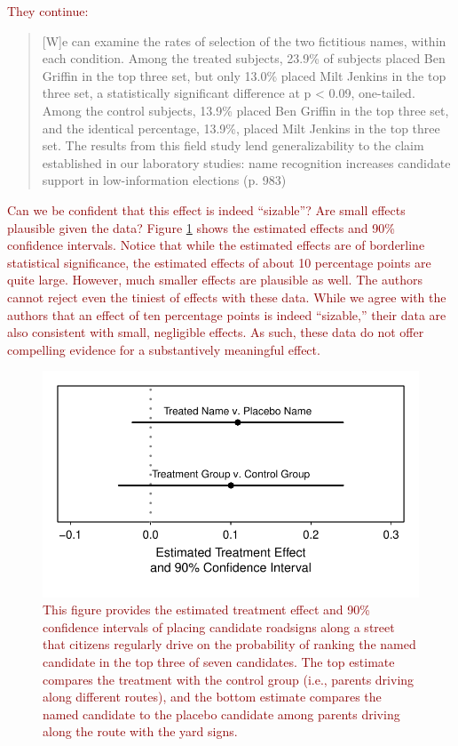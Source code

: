 \documentclass[12pt]{article}
\newcommand{\kelly}[1]{\textcolor{darkred}{#1}}
\begin{document}
\kelly{\noindent They continue:}

\kelly{\begin{quote}
[W]e can examine the rates of selection of the two fictitious names, within each condition. Among the treated subjects, 23.9\% of subjects placed Ben Griffin in the top three set, but only 13.0\% placed Milt Jenkins in the top three set, a statistically significant difference at p < 0.09, one-tailed. Among the control subjects, 13.9\% placed Ben Griffin in the top three set, and the identical percentage, 13.9\%, placed Milt Jenkins in the top three set. The results from this field study lend generalizability to the claim established in our laboratory studies: name recognition increases candidate support in low-information elections (p. 983)
\end{quote}}

\kelly{Can we be confident that this effect is indeed ``sizable''? Are small effects plausible given the data? Figure \ref{fig:kz-ci} shows the estimated effects and 90\% confidence intervals. Notice that while the estimated effects are of borderline statistical significance, the estimated effects of about 10 percentage points are quite large. However, much smaller effects are plausible as well. The authors cannot reject even the tiniest of effects with these data. While we agree with the authors that an effect of ten percentage points is indeed ``sizable,'' their data are also consistent with small, negligible effects. As such, these data do not offer compelling evidence for a substantively meaningful effect.}

\begin{figure}[H]
\begin{center}
\includegraphics[scale = .8]{figs/kz-ci.pdf}
\caption{\kelly{This figure provides the estimated treatment effect and 90\% confidence intervals of placing candidate roadsigns along a street that citizens regularly drive on the probability of ranking the named candidate in the top three of seven candidates. The top estimate compares the treatment with the control group (i.e., parents driving along different routes), and the bottom estimate compares the named candidate to the placebo candidate among parents driving along the route with the yard signs.}}\label{fig:kz-ci}
\end{center}
\end{figure}
\end{document}
